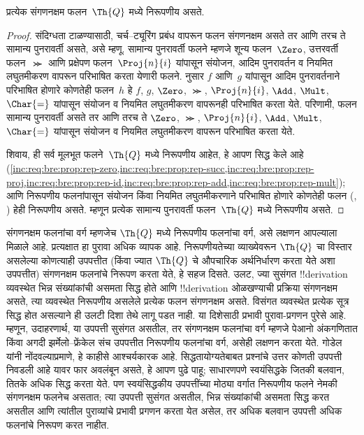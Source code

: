 \documentclass[../../../include/open-logic-section]{subfiles}
\begin{document}

\begin{thm}
प्रत्येक संगणनक्षम फलन~$\Th{Q}$ मध्ये निरूपणीय असते.
\end{thm}

\begin{proof}
संदिग्धता टाळण्यासाठी, चर्च--ट्यूरिंग प्रबंध वापरून फलन
संगणनक्षम असते तर आणि तरच ते सामान्य पुनरावर्ती असते,
असे म्हणू. सामान्य पुनरावर्ती फलने म्हणजे शून्य फलन~$\Zero$,
उत्तरवर्ती फलन~$\Succ$ आणि प्रक्षेपण फलन~$\Proj{n}{i}$
यांपासून संयोजन, आदिम पुनरावर्तन व नियमित लघुतमीकरण वापरून
परिभाषित करता येणारी फलने.  नुसार
$f$ आणि~$g$ यांपासून आदिम पुनरावर्तनाने परिभाषित होणारे
कोणतेही फलन~$h$ हे $f$, $g$, $\Zero$,
$\Succ$, $\Proj{n}{i}$, $\Add$, $\Mult$, $\Char{=}$
यांपासून संयोजन व नियमित लघुतमीकरण वापरूनही परिभाषित
करता येते. परिणामी, फलन सामान्य पुनरावर्ती असते तर आणि तरच ते $\Zero$, $\Succ$, $\Proj{n}{i}$, $\Add$,
$\Mult$, $\Char{=}$ यांपासून संयोजन व नियमित लघुतमीकरण
वापरून परिभाषित करता येते.

शिवाय, ही सर्व मूलभूत फलने~$\Th{Q}$ मध्ये निरूपणीय आहेत,
हे आपण सिद्ध केले आहे
(\cref{inc:req:bre:prop:rep-zero,inc:req:bre:prop:rep-succ,inc:req:bre:prop:rep-proj,inc:req:bre:prop:rep-id,inc:req:bre:prop:rep-add,inc:req:bre:prop:rep-mult});
आणि निरूपणीय फलनांपासून संयोजन किंवा नियमित लघुतमीकरणाने
परिभाषित होणारे कोणतेही फलन
(,
) हेही निरूपणीय असते.
म्हणून प्रत्येक सामान्य पुनरावर्ती फलन~$\Th{Q}$ मध्ये
निरूपणीय असते.
\end{proof}

\begin{explain}
संगणनक्षम फलनांचा वर्ग म्हणजेच $\Th{Q}$ मध्ये निरूपणीय
फलनांचा वर्ग, असे लक्षणन आपल्याला मिळाले आहे. प्रत्यक्षात
हा पुरावा अधिक व्यापक आहे. निरूपणीयतेच्या व्याख्येवरून
$\Th{Q}$ चा विस्तार असलेल्या कोणत्याही उपपत्तीत (किंवा
ज्यात $\Th{Q}$ चे औपचारिक अर्थनिर्धारण करता येते अशा उपपत्तीत)
संगणनक्षम फलनांचे निरूपण करता येते, हे सहज दिसते. उलट,
ज्या सुसंगत !!{derivation} व्यवस्थेत भिन्न संख्यांकांची असमता
सिद्ध होते आणि !!{derivation} ओळखण्याची प्रक्रिया संगणनक्षम
असते, त्या व्यवस्थेत निरूपणीय असलेले प्रत्येक फलन संगणनक्षम
असते. विसंगत व्यवस्थेत प्रत्येक सूत्र सिद्ध होत असल्याने
ही उलटी दिशा तेथे लागू पडत नाही. या दिशेसाठी प्रभावी पुरावा-प्रगणन
पुरेसे आहे. म्हणून, उदाहरणार्थ, या उपपत्ती सुसंगत असतील, तर संगणनक्षम
फलनांचा वर्ग म्हणजे पेआनो अंकगणितात किंवा अगदी
झर्मेलो--फ्रेंकेल संच उपपत्तीत निरूपणीय फलनांचा वर्ग,
असेही लक्षणन करता येते. गोडेल यांनी नोंदवल्याप्रमाणे,
हे काहीसे आश्चर्यकारक आहे. सिद्धतायोग्यतेबाबत प्रश्नांचे
उत्तर कोणती उपपत्ती निवडली आहे यावर फार अवलंबून असते,
हे आपण पुढे पाहू; साधारणपणे स्वयंसिद्धके जितकी बलवान,
तितके अधिक सिद्ध करता येते. पण स्वयंसिद्धकीय उपपत्तींच्या
मोठ्या वर्गात निरूपणीय फलने नेमकी संगणनक्षम फलनेच असतात;
त्या उपपत्ती सुसंगत असतील, भिन्न संख्यांकांची असमता सिद्ध करत असतील
आणि त्यांतील पुराव्यांचे प्रभावी प्रगणन करता येत असेल,
तर अधिक बलवान उपपत्ती अधिक फलनांचे निरूपण करत नाहीत.
\end{explain}
\end{document}
